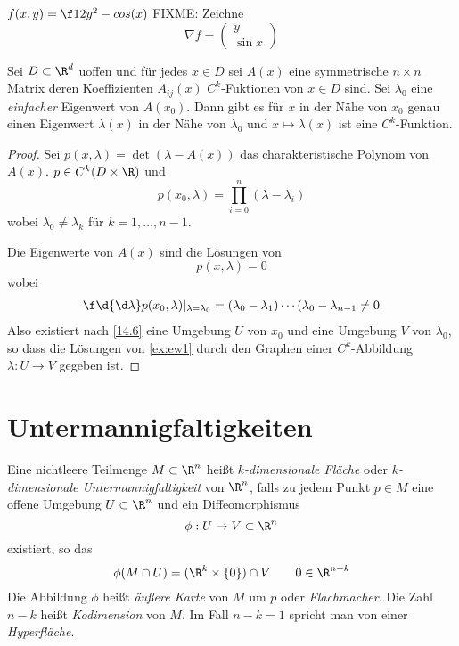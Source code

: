 \documentclass[a4paper,10pt]{scrbook}
\begin{document}
\begin{ex*}[Pendel!]
	$f(x,y) = \f 12y^2 -cos(x)$
	FIXME: Zeichne
	\[
		\nabla f = \begin{pmatrix}y\\ \sin x\end{pmatrix}
	\]
\end{ex*}

\begin{ex*}
	Sei $D\subset \R^d$ uoffen und für jedes $x\in D$ sei $A(x)$ eine symmetrische $n\times n$ Matrix deren Koeffizienten $A_{ij}(x)$ $C^k$-Fuktionen von $x\in D$ sind.
	Sei $\lambda_0$ eine \emph{einfacher} Eigenwert von $A(x_0)$.
	Dann gibt es für $x$ in der Nähe von $x_0$ genau einen Eigenwert $\lambda(x)$ in der Nähe von $\lambda_0$ und $x\mapsto \lambda(x)$ ist eine $C^k$-Funktion.
	\begin{proof}
		Sei $p(x,\lambda) = \det(\lambda-A(x))$ das charakteristische Polynom von $A(x)$.
		$p\in C^k(D\times \R)$ und
		\[
			p(x_0,\lambda) = \prod_{i=0}^n(\lambda-\lambda_i)
		\]
		wobei $\lambda_0\neq \lambda_k$ für $k=1,\dotsc,n-1$.

		Die Eigenwerte von $A(x)$ sind die Lösungen von
		\begin{equation}
			\label{ex:ew1}
			p(x,\lambda) = 0
		\end{equation}
		wobei
		\begin{align*}
			\f \d{\d\lambda}p(x_0,\lambda)|_{\lambda=\lambda_0} = (\lambda_0-\lambda_1)\dotsb (\lambda_0-\lambda_{n-1} \neq 0
		\end{align*}
		Also existiert nach \ref{14.6} eine Umgebung $U$ von $x_0$ und eine Umgebung $V$ von $\lambda_0$, so dass die Lösungen von \eqref{ex:ew1} durch den Graphen einer $C^k$-Abbildung $\lambda:U\to V$ gegeben ist.
	\end{proof}
\end{ex*}


\section{Untermannigfaltigkeiten}


Eine nichtleere Teilmenge $M\subset \R^n$ heißt \emph{$k$-dimensionale Fläche} oder \emph{$k$-dimensionale Untermannigfaltigkeit} von $\R^n$, falls zu jedem Punkt $p\in M$ eine offene Umgebung $U\subset \R^n$ und ein Diffeomorphismus
\[
	\phi:U\to V\subset \R^n
\]
existiert, so das
\[
	\phi(M\cap U) = (\R^k\times\{0\})\cap V \qquad 0\in \R^{n-k}
\]
Die Abbildung $\phi$ heißt \emph{äußere Karte} von $M$ um $p$ oder \emph{Flachmacher}.
Die Zahl $n-k$ heißt \emph{Kodimension} von $M$.
Im Fall $n-k=1$ spricht man von einer \emph{Hyperfläche}.
\end{document}

